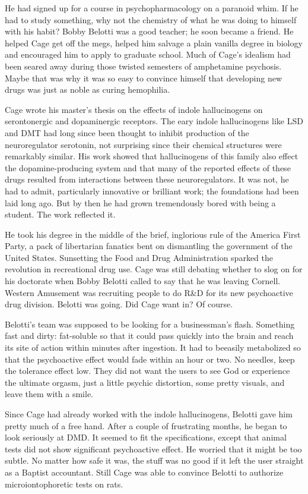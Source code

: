 He had signed up for a course in psychopharmacology on a paranoid whim. If he had to study something, why not the chemistry of what he was doing to himself with his habit? Bobby Belotti was a good teacher; he soon became a friend. He helped Cage get off the megs, helped him salvage a plain vanilla degree in biology and encouraged him to apply to graduate school. Much of Cage’s idealism had been seared away during those twisted semesters of amphetamine psychosis. Maybe that was why it was so easy to convince himself that developing new drugs was just as noble as curing hemophilia.

Cage wrote his master’s thesis on the effects of indole hallucinogens on serontonergic and dopaminergic receptors. The eary indole hallucinogens like LSD and DMT had long since been thought to inhibit production of the neuroregulator serotonin, not surprising since their chemical structures were remarkably similar. His work showed that hallucinogens of this family also effect the dopamine-producing system and that many of the reported effects of these drugs resulted from interactions between these neuroregulators. It was not, he had to admit, particularly innovative or brilliant work; the foundations had been laid long ago. But by then he had grown tremendously bored with being a student. The work reflected it.

He took his degree in the middle of the brief, inglorious rule of the America First Party, a pack of libertarian fanatics bent on dismantling the government of the United States. Sunsetting the Food and Drug Administration sparked the revolution in recreational drug use. Cage was still debating whether to slog on for his doctorate when Bobby Belotti called to say that he was leaving Cornell. Western Amusement was recruiting people to do R\&D for its new psychoactive drug division. Belotti was going. Did Cage want in? Of course.

Belotti’s team was supposed to be looking for a businessman’s flash. Something fast and dirty: fat-soluble so that it could pass quickly into the brain and reach its site of action within minutes after ingestion. It had to beeasily metabolized so that the psychoactive effect would fade within an hour or two. No needles, keep the tolerance effect low. They did not want the users to see God or experience the ultimate orgasm, just a little psychic distortion, some pretty visuals, and leave them with a smile.

Since Cage had already worked with the indole hallucinogens, Belotti gave him pretty much of a free hand. After a couple of frustrating months, he began to look seriously at DMD. It seemed to fit the specifications, except that animal tests did not show significant psychoactive effect. He worried that it might be too subtle. No matter how safe it was, the stuff was no good if it left the user straight as a Baptist accountant. Still Cage was able to convince Belotti to authorize microiontophoretic tests on rats.

